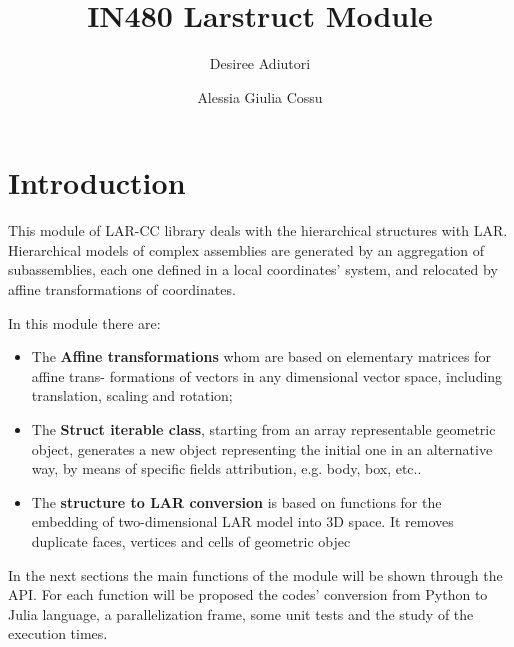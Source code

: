 \documentclass[a4paper,12pt]{article}
\begin{document}
\title{IN480 \hspace{0.5cm} Larstruct Module}
\author{Desiree Adiutori \and Alessia Giulia Cossu}
\maketitle
\tableofcontents
\listoffigures
\newpage
\section*{Introduction}
This module of LAR-CC library deals with the hierarchical structures with LAR. Hierarchical
models of complex assemblies are generated by an aggregation of subassemblies, each one defined
in a local coordinates’ system, and relocated by affine transformations of coordinates.

In this module there are:
\begin{itemize}
\item The \textbf{Affine transformations} whom are based on elementary matrices for affine trans-
formations of vectors in any dimensional vector space, including translation, scaling and
rotation;
\item The \textbf{Struct iterable class}, starting from an array representable geometric object, generates a new object representing the initial one in an alternative way, 
by means of specific fields attribution, e.g. body, box, etc..
\item The \textbf{structure to LAR conversion} is based on functions for the embedding of two-dimensional LAR model into 3D space. 
It removes duplicate faces, vertices and cells of
geometric objec
\end{itemize}

In the next sections the main functions of the module will be shown through the API. For each
function will be proposed the codes' conversion from Python to Julia language, a parallelization
frame, some unit tests and the study of the execution times.
\newpage
\end{document}
